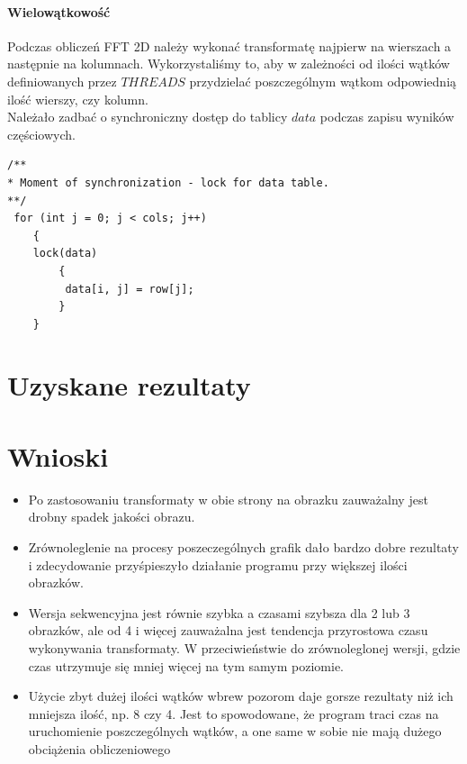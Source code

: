 \paragraph{Wielowątkowość} Podczas obliczeń FFT 2D należy wykonać transformatę najpierw na wierszach a następnie na kolumnach. Wykorzystaliśmy to, aby w zależności od ilości wątków definiowanych przez $THREADS$ przydzielać poszczególnym wątkom odpowiednią ilość wierszy, czy kolumn.\\
Należało zadbać o synchroniczny dostęp do tablicy $data$ podczas zapisu wyników częściowych.\\
\begin{lstlisting}
/**
* Moment of synchronization - lock for data table.
**/
 for (int j = 0; j < cols; j++)
	{
	lock(data)
		{
		 data[i, j] = row[j];
		}
	}
\end{lstlisting}
 
\section{Uzyskane rezultaty}
\section{Wnioski}
\begin{itemize}
	\item Po zastosowaniu transformaty w obie strony na obrazku zauważalny jest drobny spadek jakości obrazu.
	\item Zrównoleglenie na procesy poszeczególnych grafik dało bardzo dobre rezultaty i zdecydowanie przyśpieszyło działanie programu przy większej ilości obrazków.
	\item Wersja sekwencyjna jest równie szybka a czasami szybsza dla 2 lub 3 obrazków, ale od 4 i więcej zauważalna jest tendencja przyrostowa czasu wykonywania transformaty. W przeciwieństwie do zrównoleglonej wersji, gdzie czas utrzymuje się mniej więcej na tym samym poziomie.
	\item Użycie zbyt dużej ilości wątków wbrew pozorom daje gorsze rezultaty niż ich mniejsza ilość, np. 8 czy 4. Jest to spowodowane, że program traci czas na uruchomienie poszczególnych wątków, a one same w sobie nie mają dużego obciążenia obliczeniowego
\end{itemize}

